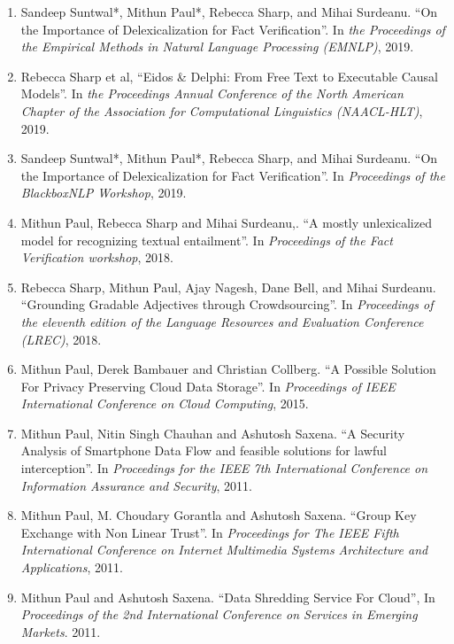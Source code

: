 \documentclass[10pt]{article}
\newcommand{\ve}[1]{{\em #1}} %
\newcommand{\ti}[1]{``#1''} %
\begin{document}
\begin{description}
\begin{enumerate}
\item Sandeep Suntwal*, Mithun Paul*, Rebecca Sharp, and Mihai Surdeanu.   \ti{On the Importance of Delexicalization for Fact Verification}. In \ve{ the Proceedings of the Empirical Methods in Natural Language Processing (EMNLP)}, 2019.

\item  Rebecca Sharp et al,   \ti{Eidos \& Delphi: From Free Text to Executable Causal Models}. In \ve{ the Proceedings Annual Conference of the North American Chapter of the Association for Computational Linguistics (NAACL-HLT)}, 2019.



\item Sandeep Suntwal*, Mithun Paul*, Rebecca Sharp, and Mihai Surdeanu.   \ti{On the Importance of Delexicalization for Fact Verification}. In \ve{Proceedings of the BlackboxNLP Workshop}, 2019.

\item Mithun Paul, Rebecca Sharp and Mihai Surdeanu,.   \ti{A mostly unlexicalized model for recognizing textual entailment}. In \ve{Proceedings of the Fact Verification workshop}, 2018.

\item Rebecca Sharp, Mithun Paul, Ajay Nagesh, Dane  Bell, and Mihai Surdeanu.   \ti{Grounding Gradable Adjectives through Crowdsourcing}. In \ve{Proceedings of the eleventh edition of the Language Resources and Evaluation Conference (LREC)}, 2018.

\item Mithun Paul, Derek Bambauer and Christian Collberg.   \ti{A Possible Solution For Privacy Preserving Cloud Data Storage}. In \ve{Proceedings of IEEE International Conference on Cloud Computing}, 2015.

\item  Mithun Paul, Nitin Singh Chauhan and Ashutosh Saxena.   \ti{A Security Analysis of Smartphone Data Flow and feasible solutions for lawful interception}. In \ve{ Proceedings for the IEEE 7th International Conference on Information Assurance and Security}, 2011.

\item  Mithun Paul, M. Choudary Gorantla and Ashutosh Saxena.   \ti{Group Key Exchange with Non Linear Trust}. In \ve{ Proceedings for The IEEE Fifth International Conference on Internet Multimedia Systems Architecture and Applications}, 2011.

\item  Mithun Paul and Ashutosh Saxena.   \ti{Data Shredding Service For Cloud}, In \ve{  Proceedings of the 2nd International Conference on Services in Emerging Markets}. 2011.


\end{enumerate}
\end{description}
\end{document}
